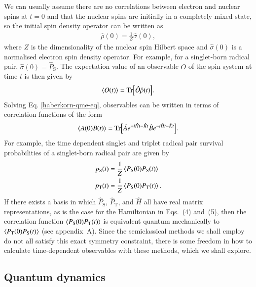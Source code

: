 \documentclass[%
aip,
jcp,%
amsmath,amssymb,
reprint%
]{revtex4-1}
\newcommand{\sing}{\ensuremath{\mathrm{S}}}
\newcommand{\trip}{\ensuremath{\mathrm{T}}}
\renewcommand{\op}[1]{\ensuremath{\hat{#1}}}
\begin{document}
We can usually assume there are no correlations between electron and nuclear spins at $t=0$ and that the nuclear spins are initially in a completely mixed state, so the initial spin density operator can be written as
\begin{align}
	\op{\rho}(0) = \frac{1}{Z}\op{\sigma}(0),
\end{align}
where $Z$ is the dimensionality of the nuclear spin Hilbert space and $\op{\sigma}(0)$ is a normalised electron spin density operator. For example, for a singlet-born radical pair, $\op{\sigma}(0) = \op{P}_\sing$. The expectation value of an observable $O$ of the spin system at time $t$ is then given by 
\begin{align}
  \ev{O(t)} = \Tr[\op{O}\op{\rho}(t)].
\end{align}
Solving Eq. \eqref{haberkorn-qme-eq}, observables can be written in terms of correlation functions of the form
\begin{align}\label{corr-func-eq}
  \ev{A(0)B(t)} = \Tr[\op{A}e^{+i\op{H}t-\op{K}t}\op{B}e^{-i\op{H}t-\op{K}t}].
\end{align}
For example, the time dependent singlet and triplet radical pair survival probabilities of a singlet-born radical pair are given by
\begin{subequations}
\begin{align}
  p_\sing(t) &= \frac{1}{Z}\ev{P_\sing(0)P_\sing(t)}\\
  p_\trip(t) &= \frac{1}{Z}\ev{P_\sing(0)P_\trip(t)}.
\end{align}
\end{subequations}
If there exists a basis in which $\op{P}_\sing$, $\op{P}_\trip$, and $\op{H}$ all have real matrix representations, as is the case for the Hamiltonian in Eqs.~(4) and~(5), then the correlation function $\ev{P_\sing(0)P_\trip(t)}$ is equivalent quantum mechanically to $\ev{P_\trip(0)P_\sing(t)}$ (see appendix~A). Since the semiclassical methods we shall employ do not all satisfy this exact symmetry constraint, there is some freedom in how to calculate time-dependent observables with these methods, which we shall explore.

\subsection{Quantum dynamics}
\end{document}
